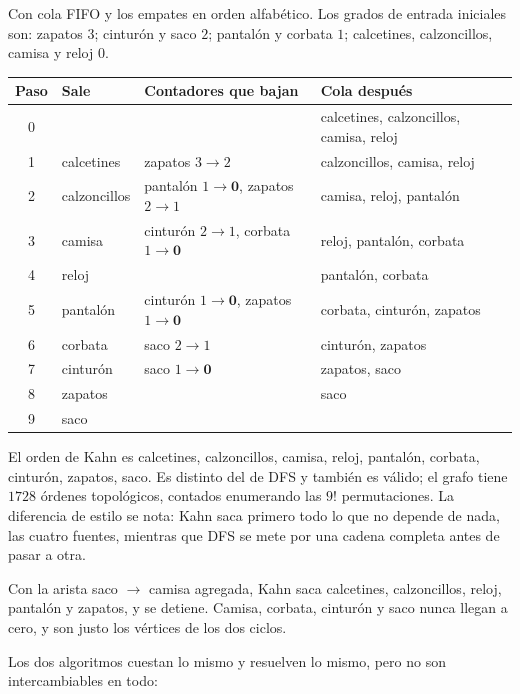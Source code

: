 \documentclass[11pt,letterpaper]{article}
\begin{document}
\begin{ejemplo}
  \label{ej:ropa-kahn}
  Con cola FIFO y los empates en orden alfabético. Los grados de
  entrada iniciales son: zapatos $3$; cinturón y saco $2$; pantalón y
  corbata $1$; calcetines, calzoncillos, camisa y reloj $0$.
  \begin{center}
  \small
  \begin{tabular}{clll}
    \toprule
    \textbf{Paso} & \textbf{Sale} & \textbf{Contadores que bajan}
      & \textbf{Cola después} \\
    \midrule
    0 & & & calcetines, calzoncillos, camisa, reloj \\
    1 & calcetines & zapatos $3 \to 2$ & calzoncillos, camisa,
      reloj \\
    2 & calzoncillos & pantalón $1 \to \mathbf{0}$, zapatos
      $2 \to 1$ & camisa, reloj, pantalón \\
    3 & camisa & cinturón $2 \to 1$, corbata $1 \to \mathbf{0}$
      & reloj, pantalón, corbata \\
    4 & reloj & & pantalón, corbata \\
    5 & pantalón & cinturón $1 \to \mathbf{0}$, zapatos
      $1 \to \mathbf{0}$ & corbata, cinturón, zapatos \\
    6 & corbata & saco $2 \to 1$ & cinturón, zapatos \\
    7 & cinturón & saco $1 \to \mathbf{0}$ & zapatos, saco \\
    8 & zapatos & & saco \\
    9 & saco & & \\
    \bottomrule
  \end{tabular}
  \end{center}
  El orden de Kahn es calcetines, calzoncillos, camisa, reloj,
  pantalón, corbata, cinturón, zapatos, saco. Es distinto del de DFS y
  también es válido; el grafo tiene $1728$ órdenes topológicos,
  contados enumerando las $9!$ permutaciones. La diferencia de estilo
  se nota: Kahn saca primero todo lo que no depende de nada, las cuatro
  fuentes, mientras que DFS se mete por una cadena completa antes de
  pasar a otra.

  Con la arista saco $\to$ camisa agregada, Kahn saca calcetines,
  calzoncillos, reloj, pantalón y zapatos, y se detiene. Camisa,
  corbata, cinturón y saco nunca llegan a cero, y son justo los
  vértices de los dos ciclos.
\end{ejemplo}

Los dos algoritmos cuestan lo mismo y resuelven lo mismo, pero no son
intercambiables en todo:
\end{document}
